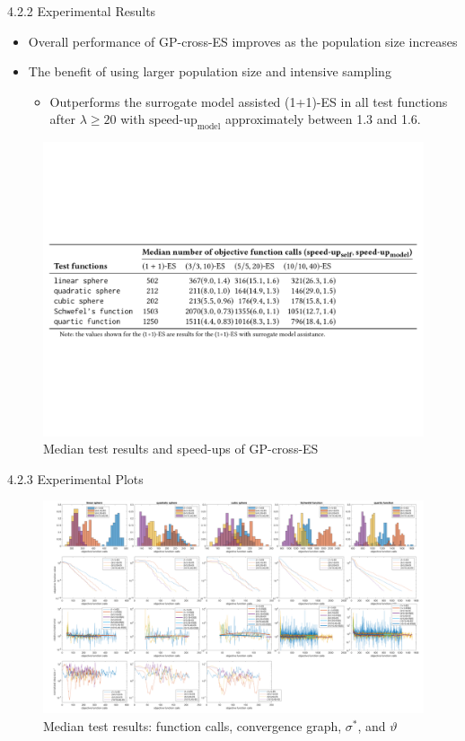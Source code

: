 \documentclass{beamer}
\begin{document}
\begin{frame}{4.2.2 Experimental Results}
\begin{itemize}
    \item Overall performance of GP-cross-ES improves as the population size increases 
    \item The benefit of using larger population size and intensive sampling 
    \begin{itemize}
        \item Outperforms the surrogate model assisted (1+1)-ES in all test functions after $\lambda\geq 20$ with $\text{speed-up}_{\text{model}}$ approximately between 1.3 and 1.6. 
    \end{itemize}
\end{itemize}
\begin{figure}
\includegraphics[width=1.0\linewidth]{tab-GP-cross-ES.pdf}
    \caption{Median test results and speed-ups of GP-cross-ES}
\end{figure}


\end{frame}

\begin{frame}{4.2.3 Experimental Plots}
\begin{figure}
\includegraphics[width=1.0\linewidth]{merged_plot_emergency_v4_final.pdf}
    \caption{Median test results: function calls, convergence graph, $\sigma^*$, and $\vartheta$}
\end{figure}
\end{frame}
\end{document}
